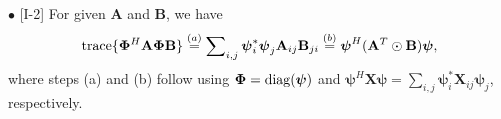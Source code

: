 \documentclass[journal,draftclsnofoot,onecolumn,12pt]{IEEEtran}
\begin{document}
    \newline$\bullet$ [I-2] For given $\mathbf{A}$ and $\mathbf{B}$, we have
            $${\rm trace}\{\mathbf{\Phi}^H \mathbf{A} \mathbf{\Phi} \mathbf{B}\} \stackrel{(a)}{=} \sum\nolimits_{i,j}\boldsymbol{\psi}^*_i\boldsymbol{\psi}_j\mathbf{A}_{ij}\mathbf{B}_{ji}\stackrel{(b)}{=}\boldsymbol{\psi}^H(\mathbf{A}^T\odot \mathbf{B})\boldsymbol{\psi},$$
            where steps (a) and (b) follow using $\mathbf{\Phi}={\rm diag}(\boldsymbol{\psi})$ and $\boldsymbol{\psi}^H\mathbf{X}\boldsymbol{\psi}=\sum_{i,j}\boldsymbol{\psi}_i^*\mathbf{X}_{ij}\boldsymbol{\psi}_j$, respectively. 
\end{document}
